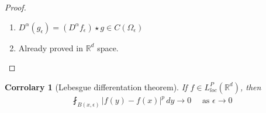 \documentclass{report}
\theoremstyle{tommy}
\newtheorem{cor}[defn]{Corrolary}
\begin{document}
  \begin{proof}
    \begin{enumerate}[label=\alph*)]
      \item \(D^\alpha(g_\epsilon) = (D^\alpha f_\epsilon) \star g \in C(\Omega_\epsilon)\)
      \item Already proved in \(\mathbb{R}^d\) space.
    \end{enumerate}
  \end{proof}

  
  \begin{cor}[Lebesgue differentation theorem]
    If \(f \in L_{loc}^P(\mathbb{R}^d)\), then
    \begin{align*}
      \fint_{B(x, \epsilon)} |f(y) - f(x)|^p \, dy \to 0 \quad \text{ as } \epsilon \to 0
    \end{align*}
    
  \end{cor}
\end{document}
